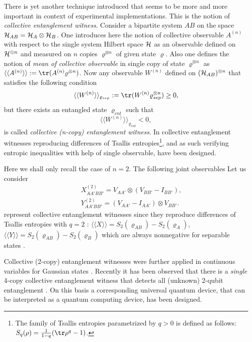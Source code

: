\documentclass[twocolumn,aps,rmp]{revtex4}
\begin{document}
There is yet another technique introduced \cite{Witnesses} that
seems to be more and more important in context of experimental
implementations. This is the notion of {\it collective entanglement
witness}. Consider a bipartite system $AB$ on the space ${\cal
H}_{AB}={\cal H}_{A} \otimes {\cal H}_{B}$. One  introduces  here
the notion of collective observable $A^{(n)}$ with respect to the
single system Hilbert space ${\cal H}$ as an observable defined on
${\cal H}^{\otimes n}$ and measured on $n$ copies $\varrho^{\otimes
n}$ of given state $\varrho$. Also one defines the notion of
{\it mean of collective observable} in single copy of state
$\varrho^{\otimes n}$ as $\langle\langle A^{(n)} \rangle
\rangle:={\tr}(A^{(n)} \varrho^{\otimes n})$. Now any observable
$W^{(n)}$ defined on $({\cal H}_{AB})^{\otimes n}$ that satisfies
the following condition
\begin{equation}
\langle \langle
W^{(n)}\rangle\rangle_{\varrho_{sep}}:={\tr}(W^{(n)}\varrho_{sep}^{\otimes
n}) \geq 0,
\end{equation}
but there exists an entangled state $\varrho_{ent}$ such that
\begin{equation}
\langle \langle W^{(n)} \rangle \rangle_{\varrho_{ent}} < 0,
\end{equation}
is called {\it collective (n-copy) entanglement witness}. In
\cite{Witnesses} collective entanglement witnesses reproducing
differences of Tsallis entropies\footnote{The family of Tsallis
  entropies parametrized by $q>0$ is defined as follows:
  $S_q(\rho)={1\over {1-q}}({\tr}\rho^{q} -1)$.}, and as such
verifying entropic inequalities with help of single observable, have
been designed.

Here we shall only recall the case of $n=2$.
The following joint observables
Let us consider
\begin{eqnarray}
&&X_{AA'BB'}^{(2)}=V_{AA'} \otimes ( V_{BB'} - I_{BB'} ), \nonumber \\
&&Y_{AA'BB'}^{(2)}=(V_{AA'} - I_{AA'}) \otimes V_{BB'}.
\label{XY}
\end{eqnarray}
represent collective entanglement witnesses since they reproduce
differences of Tsallis entropies with $q=2$ : $\langle \langle X \rangle \rangle
= S_{2}(\varrho_{AB})-S_{2}(\varrho_{A})$, $\langle\langle Y \rangle
\rangle = S_{2}(\varrho_{AB})-S_{2}(\varrho_{B})$ which are always
nonnegative for separable states \cite{alpha}.

Collective (2-copy) entanglement witnesses were further applied in
continuous variables for Gaussian states
\cite{StobinskaW-teor-s}. Recently it has been observed that there is
a {\it single} 4-copy collective entanglement witness that detects all
(unknown) 2-qubit entanglement \cite{Augusiak}. On this basis a
corresponding universal quantum device, that can be interpreted as a
quantum computing device, has been designed.
\end{document}
